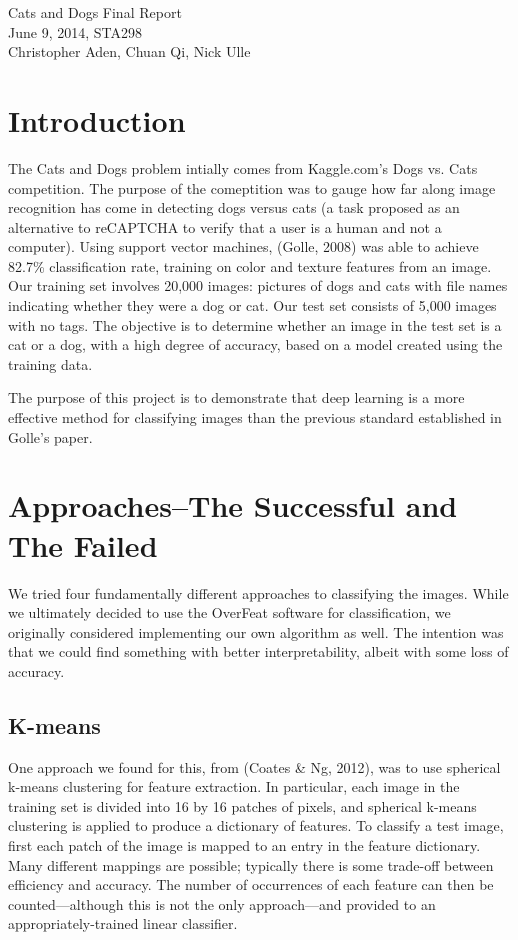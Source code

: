 \documentclass[12pt]{article}
\begin{document}
\begin{center}
Cats and Dogs Final Report\\
June 9, 2014, STA298\\
Christopher Aden, Chuan Qi, Nick Ulle\\
\end{center}

\section{Introduction}
The Cats and Dogs problem intially comes from Kaggle.com's Dogs vs. Cats competition. The purpose of the comeptition was to gauge how far along image recognition has come in detecting dogs versus cats (a task proposed as an alternative to reCAPTCHA to verify that a user is a human and not a computer). Using support vector machines, (Golle, 2008) was able to achieve 82.7\% classification rate, training on color and texture features from an image. Our training set involves 20,000 images: pictures of dogs and cats with file names indicating whether they were a dog or cat. Our test set consists of 5,000 images with no tags. The objective is to determine whether an image in the test set is a cat or a dog, with a high degree of accuracy, based on a model created using the training data.

The purpose of this project is to demonstrate that deep learning is a more effective method for classifying images than the previous standard established in Golle's paper. 

\section{Approaches--The Successful and The Failed}
We tried four fundamentally different approaches to classifying the images. While we ultimately decided to use the OverFeat software for classification, we originally considered implementing our own algorithm as well. The intention was that we could find something with better interpretability, albeit with some loss of accuracy.

\subsection{K-means}
One approach we found for this, from (Coates \& Ng, 2012), was to use spherical k-means clustering for feature extraction. In particular, each image in the training set is divided into 16 by 16 patches of pixels, and spherical k-means clustering is applied to produce a dictionary of features. To classify a test image, first each patch of the image is mapped to an entry in the feature dictionary. Many different mappings are possible; typically there is some trade-off between efficiency and accuracy. The number of occurrences of each feature can then be counted---although this is not the only approach---and provided to an appropriately-trained linear classifier.
\end{document}
